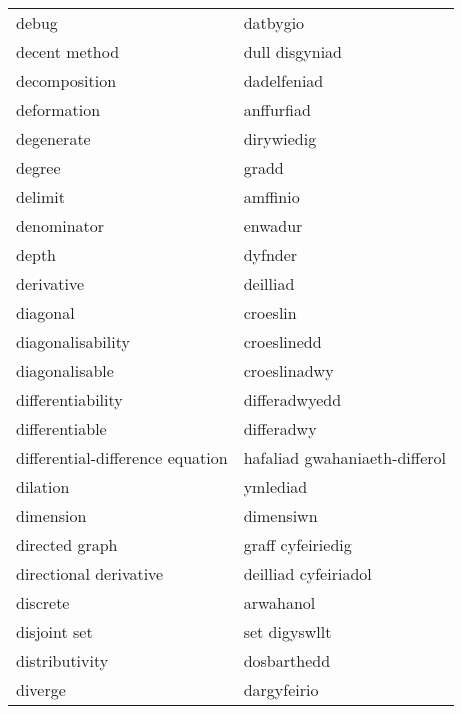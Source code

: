 \begin{supertabular}{p{0.22\textwidth}p{0.22\textwidth}}
                            debug &                         datbygio \\
                    decent method &                   dull disgyniad \\
                    decomposition &                      dadelfeniad \\
                      deformation &                       anffurfiad \\
                       degenerate &                       dirywiedig \\
                           degree &                            gradd \\
                          delimit &                         amffinio \\
                      denominator &                          enwadur \\
                            depth &                          dyfnder \\
                       derivative &                         deilliad \\
                         diagonal &                         croeslin \\
                diagonalisability &                      croeslinedd \\
                   diagonalisable &                     croeslinadwy \\
                differentiability &                    differadwyedd \\
                   differentiable &                       differadwy \\
 differential-difference equation &    hafaliad gwahaniaeth-differol \\
                         dilation &                         ymlediad \\
                        dimension &                        dimensiwn \\
                   directed graph &                graff cyfeiriedig \\
           directional derivative &             deilliad cyfeiriadol \\
                         discrete &                        arwahanol \\
                     disjoint set &                    set digyswllt \\
                   distributivity &                      dosbarthedd \\
                          diverge &                      dargyfeirio \\

\end{supertabular}

